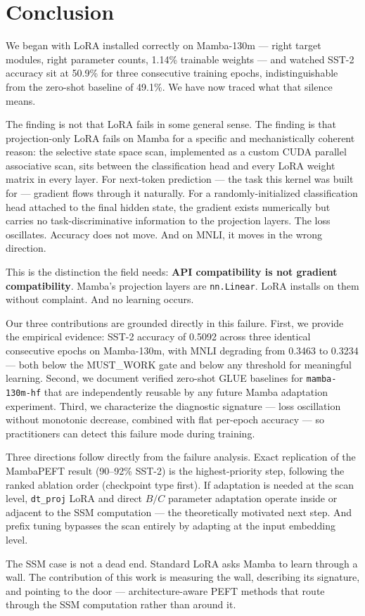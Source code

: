 \section{Conclusion}
\label{sec:conclusion}

We began with LoRA installed correctly on Mamba-130m --- right target modules, right parameter counts, 1.14\% trainable weights --- and watched SST-2 accuracy sit at 50.9\% for three consecutive training epochs, indistinguishable from the zero-shot baseline of 49.1\%. We have now traced what that silence means.

The finding is not that LoRA fails in some general sense. The finding is that projection-only LoRA fails on Mamba for a specific and mechanistically coherent reason: the selective state space scan, implemented as a custom CUDA parallel associative scan, sits between the classification head and every LoRA weight matrix in every layer. For next-token prediction --- the task this kernel was built for --- gradient flows through it naturally. For a randomly-initialized classification head attached to the final hidden state, the gradient exists numerically but carries no task-discriminative information to the projection layers. The loss oscillates. Accuracy does not move. And on MNLI, it moves in the wrong direction.

This is the distinction the field needs: \textbf{API compatibility is not gradient compatibility}. Mamba's projection layers are \texttt{nn.Linear}. LoRA installs on them without complaint. And no learning occurs.

Our three contributions are grounded directly in this failure. First, we provide the empirical evidence: SST-2 accuracy of 0.5092 across three identical consecutive epochs on Mamba-130m, with MNLI degrading from 0.3463 to 0.3234 --- both below the MUST\_WORK gate and below any threshold for meaningful learning. Second, we document verified zero-shot GLUE baselines for \texttt{mamba-130m-hf} that are independently reusable by any future Mamba adaptation experiment. Third, we characterize the diagnostic signature --- loss oscillation without monotonic decrease, combined with flat per-epoch accuracy --- so practitioners can detect this failure mode during training.

Three directions follow directly from the failure analysis. Exact replication of the MambaPEFT result (90--92\% SST-2) is the highest-priority step, following the ranked ablation order (checkpoint type first). If adaptation is needed at the scan level, \texttt{dt\_proj} LoRA and direct $B/C$ parameter adaptation operate inside or adjacent to the SSM computation --- the theoretically motivated next step. And prefix tuning bypasses the scan entirely by adapting at the input embedding level.

The SSM case is not a dead end. Standard LoRA asks Mamba to learn through a wall. The contribution of this work is measuring the wall, describing its signature, and pointing to the door --- architecture-aware PEFT methods that route through the SSM computation rather than around it.
